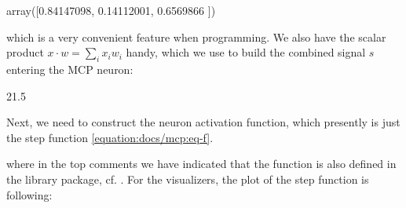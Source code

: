 \documentclass[letterpaper,10pt,english]{jupyterBook}
\begin{document}
\begin{sphinxVerbatim}[commandchars=\\\{\}]
array([0.84147098, 0.14112001, 0.6569866 ])
\end{sphinxVerbatim}

\sphinxAtStartPar
which is a very convenient feature when programming. We also have the scalar product \(x \cdot w = \sum_i x_i w_i\) handy, which we use to build the combined signal \(s\) entering the MCP neuron:

\begin{sphinxVerbatim}[commandchars=\\\{\}]
\end{sphinxVerbatim}

\begin{sphinxVerbatim}[commandchars=\\\{\}]
21.5
\end{sphinxVerbatim}

\sphinxAtStartPar
Next, we need to construct the neuron activation function, which presently is just the step function \eqref{equation:docs/mcp:eq-f}.

\begin{sphinxVerbatim}[commandchars=\\\{\}]
        
             
         
              
         
\end{sphinxVerbatim}

\sphinxAtStartPar
where in the top comments we have indicated that the function is also defined in the  library package, cf. {\hyperref[\detokenize{docs/lib_app:app-lab}]{}}. For the visualizers, the plot of the step function is following:
\end{document}
